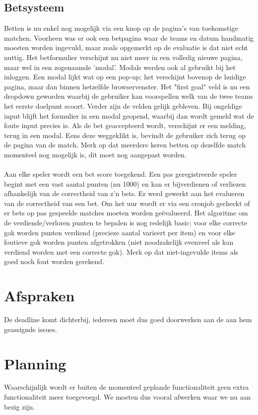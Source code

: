 \documentclass[11pt, a4paper]{article}
\begin{document}
\subsection{Betsysteem}
Betten is nu enkel nog mogelijk via een knop op de pagina's van toekomstige matchen. Voorheen was er ook een betpagina waar de teams en datum handmatig moesten worden ingevuld, maar zoals opgemerkt op de evaluatie is dat niet echt nuttig. Het betformulier verschijnt nu niet meer in een volledig nieuwe pagina, maar wel in een zogenaamde 'modal'. Modals werden ook al gebruikt bij het inloggen. Een modal lijkt wat op een pop-up; het verschijnt bovenop de huidige pagina, maar dan binnen hetzelfde browservenster. Het "first goal" veld is nu een dropdown geworden waarbij de gebruiker kan voorspellen welk van de twee teams het eerste doelpunt scoort. Verder zijn de velden gelijk gebleven. Bij ongeldige input blijft het formulier in een modal geopend, waarbij dan wordt gemeld wat de foute input precies is. Als de bet geaccepteerd wordt, verschijnt er een melding, terug in een modal. Eens deze weggeklikt is, bevindt de gebruiker zich terug op de pagina van de match. Merk op dat meerdere keren betten op dezelfde match momenteel nog mogelijk is, dit moet nog aangepast worden. \\ \\
Aan elke speler wordt een bet score toegekend. Een pas geregistreerde speler begint met een vast aantal punten (nu 1000) en kan er bijverdienen of verliezen afhankelijk van de correctheid van z'n bets. Er werd gewerkt aan het evalueren van de correctheid van een bet. Om het uur wordt er via een cronjob gecheckt of er bets op pas gespeelde matches moeten worden ge\"evalueerd. Het algoritme om de verdiende/verloren punten te bepalen is nog redelijk basic; voor elke correcte gok worden punten verdiend (precieze aantal varieert per item) en voor elke foutieve gok worden punten afgetrokken (niet noodzakelijk evenveel als kan verdiend worden met een correcte gok). Merk op dat niet-ingevulde items als goed noch fout worden gerekend.


\section{Afspraken}
De deadline komt dichterbij, iedereen moet dus goed doorwerken aan de aan hem geassignde issues.


\section{Planning}
Waarschijnlijk wordt er buiten de momenteel geplande functionaliteit geen extra functionaliteit meer toegevoegd. We moeten dus vooral afwerken waar we nu aan bezig zijn.
\end{document}
